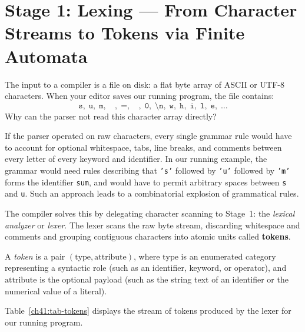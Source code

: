 \section{Stage 1: Lexing --- From Character Streams to Tokens via Finite Automata}
\label{ch41:lexing}

The input to a compiler is a file on disk: a flat byte array of ASCII or UTF-8
characters. When your editor saves our running program, the file contains:
\[
  \texttt{s},\;\texttt{u},\;\texttt{m},\;\texttt{ },\;\texttt{=},\;\texttt{ },\;\texttt{0},\;\texttt{\textbackslash n},\;\texttt{w},\;\texttt{h},\;\texttt{i},\;\texttt{l},\;\texttt{e},\;\dots
\]
Why can the parser not read this character array directly?

If the parser operated on raw characters, every single grammar rule would have
to account for optional whitespace, tabs, line breaks, and comments between
every letter of every keyword and identifier. In our running example, the
grammar would need rules describing that \texttt{'s'} followed by \texttt{'u'}
followed by \texttt{'m'} forms the identifier \texttt{sum}, and would have to
permit arbitrary spaces between \texttt{s} and \texttt{u}. Such an approach
leads to a combinatorial explosion of grammatical rules.

The compiler solves this by delegating character scanning to Stage~1: the
\emph{lexical analyzer} or \emph{lexer}. The lexer scans the raw byte stream,
discarding whitespace and comments and grouping contiguous characters into
atomic units called \textbf{tokens}.

\begin{definition}[Token]
\label{ch41:def-token}
A \emph{token} is a pair $(\text{type}, \text{attribute})$, where $\text{type}$
is an enumerated category representing a syntactic role (such as an identifier,
keyword, or operator), and $\text{attribute}$ is the optional payload (such as
the string text of an identifier or the numerical value of a literal).
\end{definition}

Table~\ref{ch41:tab-tokens} displays the stream of tokens produced by the lexer
for our running program.

